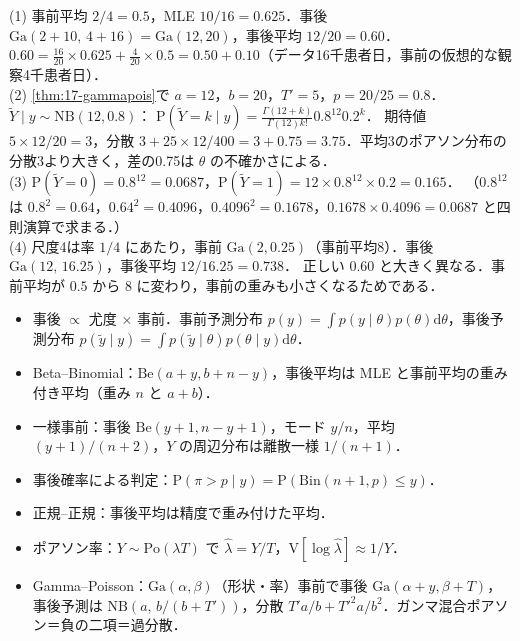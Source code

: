 \documentclass[a4paper,11pt,openany]{ltjsbook}
\newenvironment{kaitou}[1]{%
  \par\medskip\noindent
  \begin{tcolorbox}[enhanced,breakable,colback=bkgray!3,colframe=bkgray!60,boxrule=0.4pt,
    left=4pt,right=4pt,top=2pt,bottom=2pt,arc=1pt,
    title={\cref{#1}の解答},fonttitle=\bfseries\small,coltitle=white,colbacktitle=bkgray!80]}%
  {\end{tcolorbox}\par}
\newcommand{\V}{\mathrm{V}}
\newcommand{\Prob}{\mathrm{P}}
\newcommand{\dd}{\mathrm{d}}
\newcommand{\Bin}{\mathrm{Bin}}
\newcommand{\Po}{\mathrm{Po}}
\newcommand{\Ga}{\mathrm{Ga}}
\newcommand{\Be}{\mathrm{Be}}
\newcommand{\NB}{\mathrm{NB}}
\begin{document}
\begin{kaitou}{reidai:17-3}
(1) 事前平均 $2/4=0.5$，MLE $10/16=0.625$．事後 $\Ga(2+10,\,4+16)=\Ga(12,20)$，事後平均 $12/20=0.60$．
$0.60=\frac{16}{20}\times0.625+\frac{4}{20}\times0.5=0.50+0.10$（データ16千患者日，事前の仮想的な観察4千患者日）．\\
(2) \cref{thm:17-gammapois}で $a=12$，$b=20$，$T'=5$，$p=20/25=0.8$．$\tilde Y\mid y\sim\NB(12,0.8)$：
$\Prob(\tilde Y=k\mid y)=\frac{\Gamma(12+k)}{\Gamma(12)k!}0.8^{12}0.2^k$．
期待値 $5\times12/20=3$，分散 $3+25\times12/400=3+0.75=3.75$．平均3のポアソン分布の分散3より大きく，差の0.75は $\theta$ の不確かさによる．\\
(3) $\Prob(\tilde Y=0)=0.8^{12}=0.0687$，$\Prob(\tilde Y=1)=12\times0.8^{12}\times0.2=0.165$．
（$0.8^{12}$ は $0.8^2=0.64$，$0.64^2=0.4096$，$0.4096^2=0.1678$，$0.1678\times0.4096=0.0687$ と四則演算で求まる．）\\
(4) 尺度4は率 $1/4$ にあたり，事前 $\Ga(2,0.25)$（事前平均8）．事後 $\Ga(12,\,16.25)$，事後平均 $12/16.25=0.738$．
正しい $0.60$ と大きく異なる．事前平均が $0.5$ から $8$ に変わり，事前の重みも小さくなるためである．
\end{kaitou}

\begin{summarybox}
\begin{itemize}
\item 事後 $\propto$ 尤度 $\times$ 事前．事前予測分布 $p(y)=\int p(y\mid\theta)p(\theta)\dd\theta$，事後予測分布 $p(\tilde y\mid y)=\int p(\tilde y\mid\theta)p(\theta\mid y)\dd\theta$．
\item Beta--Binomial：$\Be(a+y,b+n-y)$，事後平均は MLE と事前平均の重み付き平均（重み $n$ と $a+b$）．
\item 一様事前：事後 $\Be(y+1,n-y+1)$，モード $y/n$，平均 $(y+1)/(n+2)$，$Y$ の周辺分布は離散一様 $1/(n+1)$．
\item 事後確率による判定：$\Prob(\pi>p\mid y)=\Prob(\Bin(n+1,p)\le y)$．
\item 正規--正規：事後平均は精度で重み付けた平均．
\item ポアソン率：$Y\sim\Po(\lambda T)$ で $\hat\lambda=Y/T$，$\V[\log\hat\lambda]\approx1/Y$．
\item Gamma--Poisson：$\Ga(\alpha,\beta)$（形状・率）事前で事後 $\Ga(\alpha+y,\beta+T)$，事後予測は $\NB(a,\,b/(b+T'))$，分散 $T'a/b+T'^2a/b^2$．ガンマ混合ポアソン＝負の二項＝過分散．
\end{itemize}
\end{summarybox}
\end{document}
